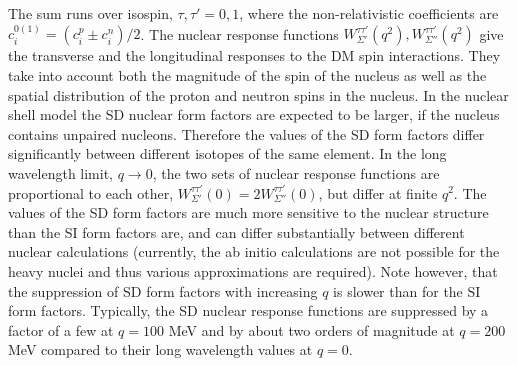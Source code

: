 The sum runs over isospin, $\tau,\tau'=0,1$, where the non-relativistic coefficients are $c_i^{0(1)}=(c_i^p\pm c_i^n)/2$. The nuclear response functions $W_{\Sigma'}^{\tau\tau'}(q^2), W_{\Sigma''}^{\tau \tau'}(q^2)$ give the transverse and the longitudinal responses to the DM spin interactions.  They take into account both the magnitude of the spin of the nucleus as well as the spatial distribution of the proton and neutron spins in the nucleus. In the nuclear shell model the SD nuclear form factors are expected to be larger, if the nucleus contains unpaired nucleons. Therefore the values of the SD form factors differ significantly between different isotopes of the same element.  In the long wavelength limit, $ q\to 0$, the two sets of nuclear response functions are proportional to each other, $W_{\Sigma'}^{\tau\tau'}(0)=2 W_{\Sigma''}^{\tau \tau'}(0)$,  but differ at finite $ q^2$. The values of the SD form factors are much more sensitive to the nuclear structure than the SI form factors are, and can differ substantially between different nuclear calculations (currently, the ab initio calculations are not possible for the heavy nuclei  and thus various approximations are required). Note however, that the suppression of SD form factors with increasing $q$ is slower than for the SI form factors. Typically, the SD nuclear response functions are suppressed by a factor of a few at $q=100$ MeV  and by about two orders of magnitude at $q=200$ MeV compared to their long wavelength values at $q=0$. 

\smallskip

